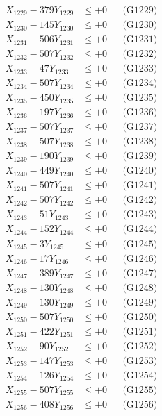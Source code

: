 \documentclass[a4paper,10pt]{article}
\begin{document}
{\begin{align}
X_{1229} - 379Y_{1229} &\leq +0 && \text{(G1229)} \\
X_{1230} - 145Y_{1230} &\leq +0 && \text{(G1230)} \\
\allowbreak
X_{1231} - 506Y_{1231} &\leq +0 && \text{(G1231)} \\
X_{1232} - 507Y_{1232} &\leq +0 && \text{(G1232)} \\
X_{1233} - 47Y_{1233} &\leq +0 && \text{(G1233)} \\
X_{1234} - 507Y_{1234} &\leq +0 && \text{(G1234)} \\
X_{1235} - 450Y_{1235} &\leq +0 && \text{(G1235)} \\
X_{1236} - 197Y_{1236} &\leq +0 && \text{(G1236)} \\
X_{1237} - 507Y_{1237} &\leq +0 && \text{(G1237)} \\
X_{1238} - 507Y_{1238} &\leq +0 && \text{(G1238)} \\
X_{1239} - 190Y_{1239} &\leq +0 && \text{(G1239)} \\
X_{1240} - 449Y_{1240} &\leq +0 && \text{(G1240)} \\
\allowbreak
X_{1241} - 507Y_{1241} &\leq +0 && \text{(G1241)} \\
X_{1242} - 507Y_{1242} &\leq +0 && \text{(G1242)} \\
X_{1243} - 51Y_{1243} &\leq +0 && \text{(G1243)} \\
X_{1244} - 152Y_{1244} &\leq +0 && \text{(G1244)} \\
X_{1245} - 3Y_{1245} &\leq +0 && \text{(G1245)} \\
X_{1246} - 17Y_{1246} &\leq +0 && \text{(G1246)} \\
X_{1247} - 389Y_{1247} &\leq +0 && \text{(G1247)} \\
X_{1248} - 130Y_{1248} &\leq +0 && \text{(G1248)} \\
X_{1249} - 130Y_{1249} &\leq +0 && \text{(G1249)} \\
X_{1250} - 507Y_{1250} &\leq +0 && \text{(G1250)} \\
\allowbreak
X_{1251} - 422Y_{1251} &\leq +0 && \text{(G1251)} \\
X_{1252} - 90Y_{1252} &\leq +0 && \text{(G1252)} \\
X_{1253} - 147Y_{1253} &\leq +0 && \text{(G1253)} \\
X_{1254} - 126Y_{1254} &\leq +0 && \text{(G1254)} \\
X_{1255} - 507Y_{1255} &\leq +0 && \text{(G1255)} \\
X_{1256} - 408Y_{1256} &\leq +0 && \text{(G1256)} \\

\end{align}}
\end{document}
